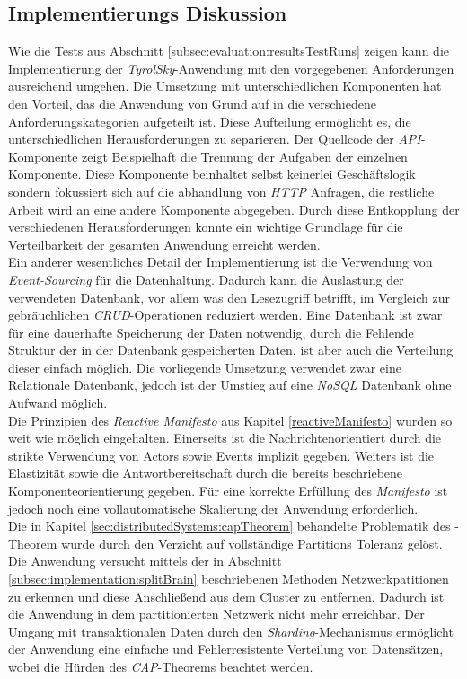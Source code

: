\subsection{Implementierungs Diskussion}
Wie die Tests aus Abschnitt \ref{subsec:evaluation:resultsTestRuns} zeigen kann die Implementierung der \textit{TyrolSky}-Anwendung mit den vorgegebenen Anforderungen ausreichend umgehen. Die Umsetzung mit unterschiedlichen Komponenten hat den Vorteil, das die Anwendung von Grund auf in die verschiedene Anforderungskategorien aufgeteilt ist. Diese Aufteilung ermöglicht es, die unterschiedlichen Herausforderungen zu separieren. Der Quellcode der \textit{API}-Komponente zeigt Beispielhaft die Trennung der Aufgaben der einzelnen Komponente. Diese Komponente beinhaltet selbst keinerlei Geschäftslogik sondern fokussiert sich auf die abhandlung von \textit{HTTP} Anfragen, die restliche Arbeit wird an eine andere Komponente abgegeben. Durch diese Entkopplung der verschiedenen Herausforderungen konnte ein wichtige Grundlage für die Verteilbarkeit der gesamten Anwendung erreicht werden. \\
Ein anderer wesentliches Detail der Implementierung ist die Verwendung von \textit{Event-Sourcing} für die Datenhaltung. Dadurch kann die Auslastung der verwendeten Datenbank, vor allem was den Lesezugriff betrifft, im Vergleich zur gebräuchlichen \textit{CRUD}-Operationen reduziert werden. 
Eine Datenbank ist zwar für eine dauerhafte Speicherung der Daten notwendig, durch die Fehlende Struktur der in der Datenbank gespeicherten Daten, ist aber auch die Verteilung dieser einfach möglich. Die vorliegende Umsetzung verwendet zwar eine Relationale Datenbank, jedoch ist der Umstieg auf eine \textit{NoSQL} Datenbank ohne Aufwand möglich. \\
Die Prinzipien des \textit{Reactive Manifesto} aus Kapitel \ref{reactiveManifesto} wurden so weit wie möglich eingehalten. Einerseits ist die Nachrichtenorientiert durch die strikte Verwendung von Actors sowie Events implizit gegeben. Weiters ist die Elastizität sowie die Antwortbereitschaft durch die bereits beschriebene Komponenteorientierung gegeben. Für eine korrekte Erfüllung des \textit{Manifesto} ist jedoch noch eine vollautomatische Skalierung der Anwendung erforderlich. \\
Die in Kapitel \ref{sec:distributedSystems:capTheorem} behandelte Problematik des -Theorem wurde durch den Verzicht auf vollständige Partitions Toleranz gelöst. Die Anwendung versucht mittels der in Abschnitt 
\ref{subsec:implementation:splitBrain} beschriebenen Methoden Netzwerkpatitionen zu erkennen und diese Anschließend aus dem Cluster zu entfernen. Dadurch ist die Anwendung in dem partitionierten Netzwerk nicht mehr erreichbar. Der Umgang mit transaktionalen Daten durch den \textit{Sharding}-Mechanismus ermöglicht der Anwendung eine einfache und Fehlerresistente Verteilung von Datensätzen, wobei die Hürden des \textit{CAP}-Theorems beachtet werden.


